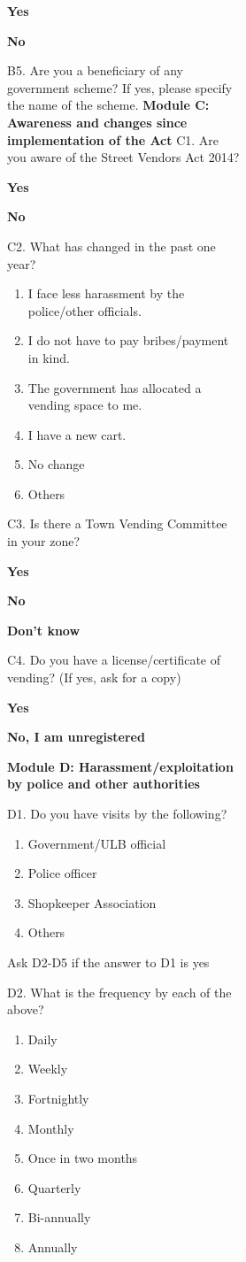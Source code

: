 \documentclass[a4paper, 12pt, twoside]{article}
\begin{document}
\begin{figure}
{\begin{figure}
\begin{figure}
\begin{mdframed}[backgroundcolor=gray!20]
\textbf{Yes}

\textbf{No}

B5. Are you a beneficiary of any government scheme? If yes, please specify the name of the scheme.
\textbf{Module C: Awareness and changes since implementation of the Act}
C1. Are you aware of the Street Vendors Act 2014?

\textbf{Yes}

\textbf{No}

C2. What has changed in the past one year?
\begin{enumerate}[nosep]
\item I face less harassment by the police/other officials.
\item I do not have to pay bribes/payment in kind.
\item The government has allocated a vending space to me.
\item I have a new cart.
\item No change
\item Others
\end{enumerate}

C3. Is there a Town Vending Committee in your zone?

\textbf{Yes}

\textbf{No}

\textbf{Don’t know}

C4. Do you have a license/certificate of vending? (If yes, ask for a copy)

\textbf{Yes}

\textbf{No, I am unregistered}

\textbf{Module D: Harassment/exploitation by police and other authorities}

D1. Do you have visits by the following?
\begin{enumerate}[nosep]
\item Government/ULB official
\item Police officer
\item Shopkeeper Association
\item Others
\end{enumerate}

Ask D2-D5 if the answer to D1 is yes

D2. What is the frequency by each of the above?
\begin{enumerate}[nosep]
\item Daily
\item Weekly
\item Fortnightly
\item Monthly
\item Once in two months
\item Quarterly
\item Bi-annually
\item Annually
\end{enumerate}


\end{mdframed}
\end{figure}
\end{figure}}
\end{figure}
\end{document}

